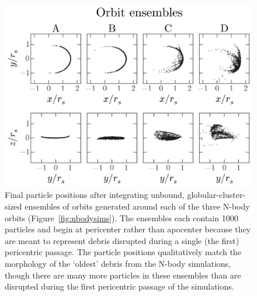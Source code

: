 \documentclass[letterpaper,12pt,preprint]{aastex}
\begin{document}
\begin{figure}[p]
\begin{center}
\includegraphics[width=\textwidth]{figures/ensembles.png}
\caption{Final particle positions after integrating unbound, globular-cluster-sized ensembles of orbits generated around each of the three N-body orbits (Figure~\ref{fig:nbodysims}). The ensembles each contain 1000 particles and begin at pericenter rather than apocenter because they are meant to represent debris disrupted during a single (the first) pericentric passage. The particle positions qualitatively match the morphology of the `oldest' debris from the N-body simulations, though there are many more particles in these ensembles than are disrupted during the first pericentric passage of the simulations. } 
\label{fig:ensembles}
\end{center}
\end{figure}
\end{document}
